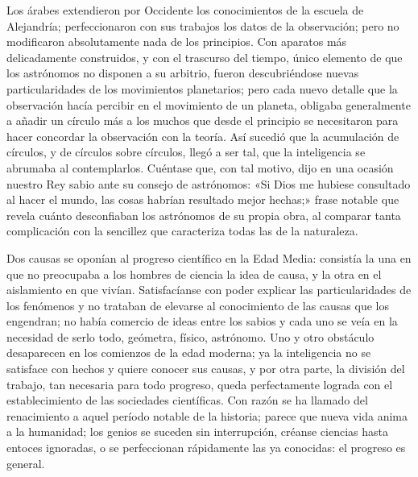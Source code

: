 \documentclass[a4paper, 12pt]{article}
\begin{document}
Los árabes extendieron por Occidente los conocimientos de la escuela de Alejandría; perfeccionaron con sus trabajos los datos de la observación; pero no modificaron absolutamente nada de los principios. Con aparatos más delicadamente construidos, y con el trascurso del tiempo, único elemento de que los astrónomos no disponen a su arbitrio, fueron descubriéndose nuevas particularidades de los movimientos planetarios; pero cada nuevo detalle que la observación hacía percibir en el movimiento de un planeta, obligaba generalmente a añadir un círculo más a los muchos que desde el principio se necesitaron para hacer concordar la observación con la teoría. Así sucedió que la acumulación de círculos, y de círculos sobre círculos, llegó a ser tal, que la inteligencia se abrumaba al contemplarlos. Cuéntase que, con tal motivo, dijo en una ocasión nuestro Rey sabio ante su consejo de astrónomos: «Si Dios me hubiese consultado al hacer el mundo, las cosas habrían resultado mejor hechas;» frase notable que revela cuánto desconfiaban los astrónomos de su propia obra, al comparar tanta complicación con la sencillez que caracteriza todas las de la naturaleza.


Dos causas se oponían al progreso científico en la Edad Media: consistía la una en que no preocupaba a los hombres de ciencia la idea de causa, y la otra en el aislamiento en que vivían. Satisfacíanse con poder explicar las particularidades de los fenómenos y no trataban de elevarse al conocimiento de las causas que los engendran; no había comercio de ideas entre los sabios y cada uno se veía en la necesidad de serlo todo, geómetra, físico, astrónomo. Uno y otro obstáculo desaparecen en los comienzos de la edad moderna; ya la inteligencia no se satisface con hechos y quiere conocer sus causas, y por otra parte, la división del trabajo, tan necesaria para todo progreso, queda perfectamente lograda con el establecimiento de las sociedades científicas. Con razón se ha llamado del renacimiento a aquel período notable de la historia; parece que nueva vida anima a la humanidad; los genios se suceden sin interrupción, créanse ciencias hasta entoces ignoradas, o se perfeccionan rápidamente las ya conocidas: el progreso es general.
\end{document}
